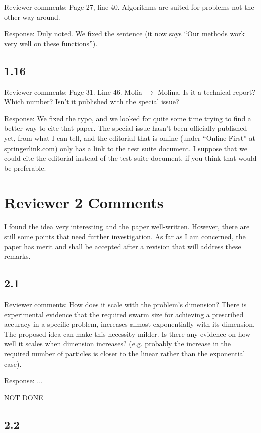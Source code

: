 \documentclass[onecolumn, 12pt]{article}
\begin{document}
Reviewer comments: Page 27, line 40. Algorithms are suited for problems not the
other way around.

Response: Duly noted.  We fixed the sentence (it now says ``Our methods work
very well on these functions'').

\subsection*{1.16}

Reviewer comments: Page 31. Line 46. Molia $\rightarrow$ Molina. Is it a
technical report?  Which number?  Isn't it published with the special issue?

Response:  We fixed the typo, and we looked for quite some time trying to find
a better way to cite that paper.  The special issue hasn't been officially
published yet, from what I can tell, and the editorial that is online (under
``Online First'' at springerlink.com) only has a link to the test suite
document.  I suppose that we could cite the editorial instead of the test suite
document, if you think that would be preferable.

\section*{Reviewer 2 Comments}

I found the idea very interesting and the paper well-written. However, there
are still some points that need further investigation.  As far as I am
concerned, the paper has merit and shall be accepted after a revision that will
address these remarks.

\subsection*{2.1}

Reviewer comments: How does it scale with the problem's dimension? There is
experimental evidence that the required swarm size for achieving a prescribed
accuracy in a specific problem, increases almost exponentially with its
dimension. The proposed idea can make this necessity milder. Is there any
evidence on how well it scales when dimension increases? (e.g. probably the
increase in the required number of particles is closer to the linear rather
than the exponential case).

Response: ...

NOT DONE

\subsection*{2.2}
\end{document}

